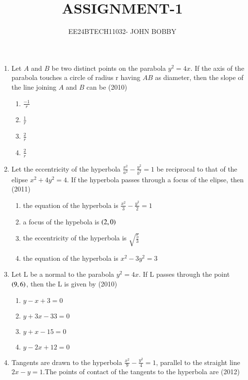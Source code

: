\documentclass[journal,12pt,onecolumn]{IEEEtran}
\theoremstyle{remark}
\begin{document}

\vspace{3cm}

\title{ASSIGNMENT-1}
\author{EE24BTECH11032- JOHN BOBBY}
\maketitle

\bigskip

\begin{enumerate}
	\item Let $A$ and $B$ be two distinct points on the parabola $y^2=4x$. If
the axis of the parabola touches a circle of radius r having
		$AB$ as diameter, then the slope of the line joining $A$ and $B$
 can be 
		\hfill(2010)
		
		\begin{enumerate}
			\item$\frac{-1}{r}$
			\item$\frac{1}{r}$
			\item$\frac{2}{r}$
			\item$\frac{2}{r}$
		\end{enumerate}
	\item Let the eccentricity of the hyperbola $\frac{x^2}{a^2}-\frac{y^2}{b^2}=1$ be reciprocal to that of the elipse $x^2+4y^2=4$. If the hyperbola
	passes through a focus of the elipse, then 
		\hfill(2011)
		
		\begin{enumerate}
			\item the equation of the hyperbola is $\frac{x^2}{3}-\frac{y^2}{2}=1$
			\item a focus of the hypebola is $\left(2,0\right)$
			\item the eccentricity of the hyperbola is $\sqrt{\frac{5}{3}}$
			\item the equation of the hyperbola is $x^2-3y^2=3$
		\end{enumerate}
	\item Let L be a normal to the parabola $y^2=4x$. If L passes through the point $\left(9,6\right)$, then the L is given by 
		\hfill(2010)
		
		\begin{enumerate}
			\item $y-x+3=0$
			\item $y+3x-33=0$
			\item $y+x-15=0$
			\item $y-2x+12=0$
		\end{enumerate}
	\item Tangents are drawn to the hyperbola $\frac{x^2}{9}-\frac{y^2}{4}=1$, parallel to the straight line $2x-y=1$.The points of contact of the tangents to the hyperbola
		are  
		\hfill(2012)
		

\end{enumerate}
\end{document}
